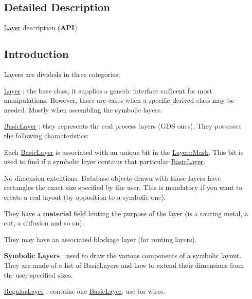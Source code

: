 \subsection{Detailed Description}
\hyperlink{classHurricane_1_1Layer}{Layer} description ({\bfseries A\+PI}) 

\hypertarget{classHurricane_1_1Layer_secLayerIntro}{}\subsection{Introduction}\label{classHurricane_1_1Layer_secLayerIntro}
Layers are divideds in three categories\+: 
\begin{DoxyItemize}
\item \hyperlink{classHurricane_1_1Layer}{Layer} \+: the base class, it supplies a generic interface sufficent for most manipulations. However, there are cases when a specific derived class may be needed. Mostly when assembling the symbolic layers. 
\item \hyperlink{classHurricane_1_1BasicLayer}{Basic\+Layer} \+: they represents the real process layers (G\+DS ones). They possesses the following characteristics\+: 
\begin{DoxyItemize}
\item Each \hyperlink{classHurricane_1_1BasicLayer}{Basic\+Layer} is associated with an unique bit in the \hyperlink{classHurricane_1_1Layer_af5277c670637bd5d910237e7afe01a91}{Layer\+::\+Mask}. This bit is used to find if a symbolic layer contains that particular \hyperlink{classHurricane_1_1BasicLayer}{Basic\+Layer}. 
\item No dimension extentions. Database objects drawn with those layers have rectangles the exact size specified by the user. This is mandatory if you want to create a real layout (by opposition to a symbolic one). 
\item They have a {\bfseries material} field hinting the purpose of the layer (is a routing metal, a cut, a diffusion and so on). 
\item They may have an associated blockage layer (for routing layers). 
\end{DoxyItemize}
\item {\bfseries Symbolic Layers} \+: used to draw the various components of a symbolic layout. They are made of a list of Basic\+Layers and how to extend their dimensions from the user specified sizes. 
\begin{DoxyItemize}
\item \hyperlink{classHurricane_1_1RegularLayer}{Regular\+Layer} \+: contains one \hyperlink{classHurricane_1_1BasicLayer}{Basic\+Layer}, use for wires. 

\end{DoxyItemize}
\end{DoxyItemize}
